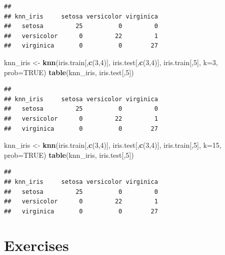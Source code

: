 \documentclass[
]{krantz}
\newenvironment{Shaded}{\begin{snugshade}}{\end{snugshade}}
\newcommand{\DataTypeTok}[1]{\textcolor[rgb]{0.13,0.29,0.53}{#1}}
\newcommand{\DecValTok}[1]{\textcolor[rgb]{0.00,0.00,0.81}{#1}}
\newcommand{\KeywordTok}[1]{\textcolor[rgb]{0.13,0.29,0.53}{\textbf{#1}}}
\newcommand{\NormalTok}[1]{#1}
\newcommand{\OtherTok}[1]{\textcolor[rgb]{0.56,0.35,0.01}{#1}}
\newcommand{\StringTok}[1]{\textcolor[rgb]{0.31,0.60,0.02}{#1}}
\begin{document}
\begin{verbatim}
##             
## knn_iris     setosa versicolor virginica
##   setosa         25          0         0
##   versicolor      0         22         1
##   virginica       0          0        27
\end{verbatim}

\begin{Shaded}
\begin{Highlighting}[]
\NormalTok{knn\_iris \textless{}{-}}\StringTok{ }\KeywordTok{knn}\NormalTok{(iris.train[,}\KeywordTok{c}\NormalTok{(}\DecValTok{3}\NormalTok{,}\DecValTok{4}\NormalTok{)], iris.test[,}\KeywordTok{c}\NormalTok{(}\DecValTok{3}\NormalTok{,}\DecValTok{4}\NormalTok{)], }
\NormalTok{        iris.train[,}\DecValTok{5}\NormalTok{], }\DataTypeTok{k=}\DecValTok{3}\NormalTok{, }\DataTypeTok{prob=}\OtherTok{TRUE}\NormalTok{)}
\KeywordTok{table}\NormalTok{(knn\_iris, iris.test[,}\DecValTok{5}\NormalTok{])}
\end{Highlighting}
\end{Shaded}

\begin{verbatim}
##             
## knn_iris     setosa versicolor virginica
##   setosa         25          0         0
##   versicolor      0         22         1
##   virginica       0          0        27
\end{verbatim}

\begin{Shaded}
\begin{Highlighting}[]
\NormalTok{knn\_iris \textless{}{-}}\StringTok{ }\KeywordTok{knn}\NormalTok{(iris.train[,}\KeywordTok{c}\NormalTok{(}\DecValTok{3}\NormalTok{,}\DecValTok{4}\NormalTok{)], iris.test[,}\KeywordTok{c}\NormalTok{(}\DecValTok{3}\NormalTok{,}\DecValTok{4}\NormalTok{)], }
\NormalTok{        iris.train[,}\DecValTok{5}\NormalTok{], }\DataTypeTok{k=}\DecValTok{15}\NormalTok{, }\DataTypeTok{prob=}\OtherTok{TRUE}\NormalTok{)}
\KeywordTok{table}\NormalTok{(knn\_iris, iris.test[,}\DecValTok{5}\NormalTok{])}
\end{Highlighting}
\end{Shaded}

\begin{verbatim}
##             
## knn_iris     setosa versicolor virginica
##   setosa         25          0         0
##   versicolor      0         22         1
##   virginica       0          0        27
\end{verbatim}

\hypertarget{exClass}{%
\section{Exercises}\label{exClass}}
\end{document}
